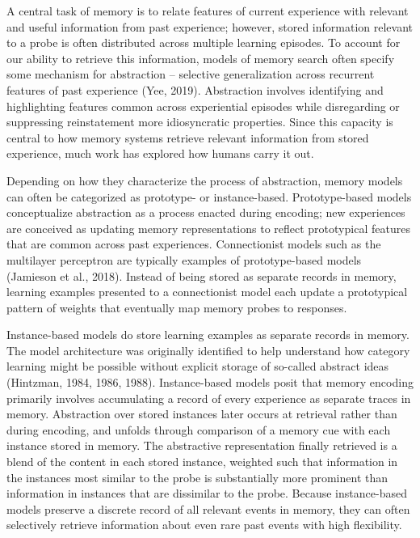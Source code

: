 \documentclass[
  letterpaper,
  DIV=11,
  numbers=noendperiod]{scrreport}
\begin{document}
A central task of memory is to relate features of current experience
with relevant and useful information from past experience; however,
stored information relevant to a probe is often distributed across
multiple learning episodes. To account for our ability to retrieve this
information, models of memory search often specify some mechanism for
abstraction -- selective generalization across recurrent features of
past experience (Yee, 2019). Abstraction involves identifying and
highlighting features common across experiential episodes while
disregarding or suppressing reinstatement more idiosyncratic properties.
Since this capacity is central to how memory systems retrieve relevant
information from stored experience, much work has explored how humans
carry it out.

Depending on how they characterize the process of abstraction, memory
models can often be categorized as prototype- or instance-based.
Prototype-based models conceptualize abstraction as a process enacted
during encoding; new experiences are conceived as updating memory
representations to reflect prototypical features that are common across
past experiences. Connectionist models such as the multilayer perceptron
are typically examples of prototype-based models (Jamieson et al.,
2018). Instead of being stored as separate records in memory, learning
examples presented to a connectionist model each update a prototypical
pattern of weights that eventually map memory probes to responses.

Instance-based models do store learning examples as separate records in
memory. The model architecture was originally identified to help
understand how category learning might be possible without explicit
storage of so-called abstract ideas (Hintzman, 1984, 1986, 1988).
Instance-based models posit that memory encoding primarily involves
accumulating a record of every experience as separate traces in memory.
Abstraction over stored instances later occurs at retrieval rather than
during encoding, and unfolds through comparison of a memory cue with
each instance stored in memory. The abstractive representation finally
retrieved is a blend of the content in each stored instance, weighted
such that information in the instances most similar to the probe is
substantially more prominent than information in instances that are
dissimilar to the probe. Because instance-based models preserve a
discrete record of all relevant events in memory, they can often
selectively retrieve information about even rare past events with high
flexibility.
\end{document}
